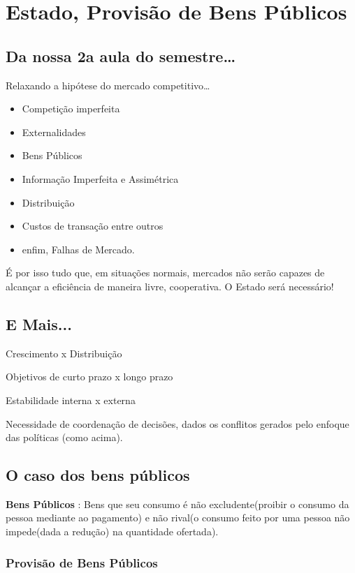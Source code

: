 \documentclass[a4paper,12pt]{article}[abntex2]
\begin{document}
\newpage
\section{\textbf{Estado, Provisão de Bens Públicos}}
\subsection{\textbf{Da nossa 2a aula do semestre…}}
Relaxando a hipótese do mercado competitivo… \begin{itemize}
    \item Competição imperfeita
    \item Externalidades
    \item Bens Públicos
    \item Informação Imperfeita e Assimétrica
    \item Distribuição
    \item Custos de transação entre outros
   \item  enfim, Falhas de Mercado.
\end{itemize}

É por isso tudo que, em situações normais, mercados não serão capazes de alcançar a eficiência de maneira livre, cooperativa. O Estado será necessário!

\subsection{\textbf{E Mais...}}
Crescimento x Distribuição

 Objetivos de curto prazo x longo prazo
 
 Estabilidade interna x externa

Necessidade de coordenação de decisões, dados os conflitos gerados pelo enfoque das políticas (como acima).

\subsection{\textbf{O caso dos bens públicos}}

\textbf{Bens Públicos} : Bens que seu consumo é não excludente(proibir o consumo da pessoa mediante ao pagamento) e não rival(o consumo feito por uma pessoa não impede(dada a redução) na quantidade ofertada).

\subsubsection{\textbf{Provisão de Bens Públicos}}
\end{document}

